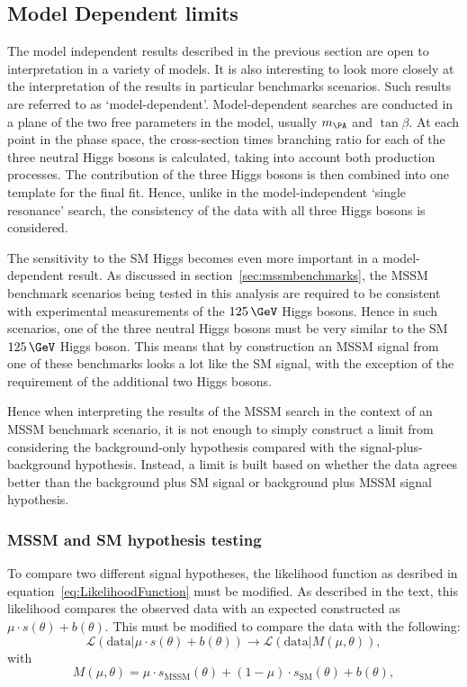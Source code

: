 \subsection{Model Dependent limits}
\label{sec:modeldependent}

The model independent results described in the previous section are open to
interpretation in a variety of models. It is also interesting to look more
closely at the interpretation of the results in particular benchmarks scenarios.
Such results are referred to as `model-dependent'. Model-dependent searches are
conducted in a plane of the two free parameters in the model, usually $m_{\PA}$
and $\tan\beta$. At each point in the phase space, the cross-section times
branching ratio for each of the three neutral Higgs bosons is calculated, taking
into account both production processes. The contribution of the three Higgs
bosons is then combined into one template for the final fit. Hence, unlike in the
model-independent `single resonance' search, the consistency of the data with
all three Higgs bosons is considered. 

The sensitivity to the \ac{SM} Higgs becomes even more important in a
model-dependent result. As discussed in
section~\ref{sec:mssmbenchmarks}, the \ac{MSSM} benchmark scenarios being tested in this
analysis are required to be consistent with experimental measurements of the
$125\,\GeV$ Higgs bosons. Hence in such scenarios, one of the three neutral Higgs
bosons must be very similar to the \ac{SM} $125\,\GeV$ Higgs boson. This means
that by construction an \ac{MSSM} signal from one of these benchmarks looks a
lot like the \ac{SM} signal, with the exception of the requirement of the
additional two Higgs bosons.

Hence when interpreting the results of the \ac{MSSM} search in the context of an
\ac{MSSM} benchmark scenario, it is not enough to simply construct a limit from
considering the background-only hypothesis compared with the
signal-plus-background hypothesis. Instead, a limit is built based on
whether the data agrees better than the background plus \ac{SM} signal or
background plus \ac{MSSM} signal hypothesis.

\subsubsection{\ac{MSSM} and \ac{SM} hypothesis testing}

To compare two different signal hypotheses, the likelihood function as desribed
in equation~\ref{eq:LikelihoodFunction} must be modified. As described in the
text, this likelihood compares the observed data with an expected constructed as
$\mu \cdot s(\theta) + b(\theta)$. This must be modified to compare the data with the
following:
\begin{equation}
\mathcal{L}(\text{data} | \mu \cdot s(\theta) + b(\theta)) \rightarrow
\mathcal{L}(\text{data} | M(\mu,\theta)),
\end{equation}
with
\begin{equation}
M(\mu,\theta) = \mu \cdot s_{\text{MSSM}}(\theta) + (1-\mu) \cdot
s_{\text{SM}}(\theta) + b(\theta), 
\end{equation}

